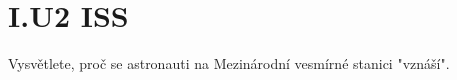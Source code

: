 \documentclass[crop=false]{standalone}
\begin{document}
\section*{I.U2 ISS}
Vysvětlete, proč se astronauti na Mezinárodní vesmírné stanici "vznáší".
\end{document}
